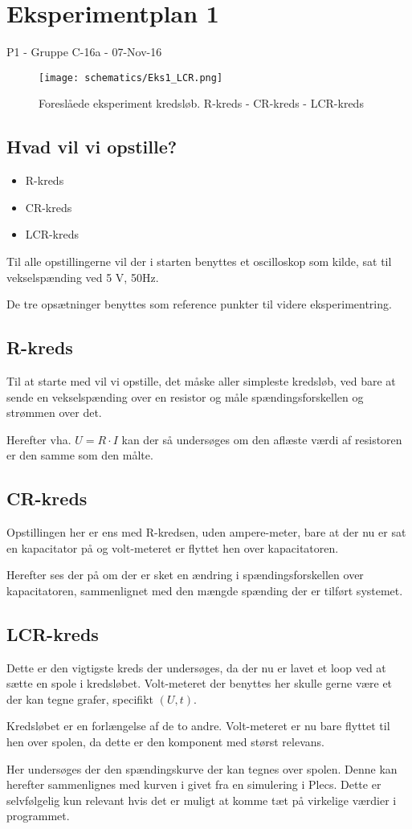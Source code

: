 \documentclass[a4paper,11pt]{memoir}
\begin{document}
\chapter{Eksperimentplan 1}
P1 - Gruppe C-16a - 07-Nov-16

\begin{figure}[htbp]
\centering
\texttt{[image: schematics/Eks1\_LCR.png]}
\caption{Foreslåede eksperiment kredsløb. R-kreds - CR-kreds - LCR-kreds}
\label{fig:Eks1}
\end{figure}
\newpage

\section{Hvad vil vi opstille?}
\begin{itemize}
\item R-kreds
\item CR-kreds
\item LCR-kreds
\end{itemize}
Til alle opstillingerne vil der i starten benyttes et oscilloskop som kilde, sat til vekselspænding ved 5 V, 50Hz.

De tre opsætninger benyttes som reference punkter til videre eksperimentring.  
\section{R-kreds}
Til at starte med vil vi opstille, det måske aller simpleste kredsløb, ved bare at sende en vekselspænding over en resistor og måle spændingsforskellen og strømmen over det.

Herefter vha. $U=R\cdot I$ kan der så undersøges om den aflæste værdi af resistoren er den samme som den målte.
\section{CR-kreds}
Opstillingen her er ens med R-kredsen, uden ampere-meter, bare at der nu er sat en kapacitator på og volt-meteret er flyttet hen over kapacitatoren.

Herefter ses der på om der er sket en ændring i spændingsforskellen over kapacitatoren, sammenlignet med den mængde spænding der er tilført systemet.
\section{LCR-kreds}
Dette er den vigtigste kreds der undersøges, da der nu er lavet et loop ved at sætte en spole i kredsløbet. Volt-meteret der benyttes her skulle gerne være et der kan tegne grafer, specifikt $(U,t)$.

Kredsløbet er en forlængelse af de to andre. Volt-meteret er nu bare flyttet til hen over spolen, da dette er den komponent med størst relevans.

Her undersøges der den spændingskurve der kan tegnes over spolen. Denne kan herefter sammenlignes med kurven i givet fra en simulering i Plecs. Dette er selvfølgelig kun relevant hvis det er muligt at komme tæt på virkelige værdier i programmet.
\end{document}
